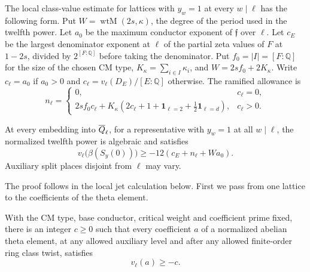 The local class-value estimate for lattices with
\(y_w=1\) at every \(w\mid\ell\) has the following form.
Put \(W=\operatorname{wtM}(2s,\kappa)\), the degree of
the period used in the twelfth power. Let \(a_0\) be the
maximum conductor exponent of \(\mathfrak f\) over \(\ell\).
Let \(c_E\) be the largest denominator exponent at
\(\ell\) of the partial zeta values of \(F\) at \(1-2s\),
divided by \(2^{[F:\mathbb Q]}\) before taking the
denominator. Put \(f_0=|I|=[F:\mathbb Q]\) for the size
of the chosen CM type, \(K_\kappa=\sum_{i\in I}\kappa_i\),
and \(W=2sf_0+2K_\kappa\).
Write \(c_\ell=a_0\) if \(a_0>0\) and
\(c_\ell=v_\ell(D_E)/[E:\mathbb Q]\) otherwise. The
ramified allowance is
\[
 n_\ell =
 \begin{cases}
 0,&c_\ell=0,\\
 2sf_0c_\ell+K_\kappa(2c_\ell+1+
       \mathbf 1_{\ell=2}+\tfrac12\mathbf 1_{\ell=d}),&c_\ell>0 .
 \end{cases}
\]
\begin{proposition}\label{prop:toric-class-denominator}
At every embedding into \(\overline{Q}_\ell\), for a representative
with \(y_w=1\) at all \(w\mid\ell\), the normalized twelfth
power is algebraic and satisfies
\[
    v_\ell\bigl(\beta(S_y(0))\bigr)\ge-12(c_E+n_\ell+Wa_0).
\]
Auxiliary split places disjoint from \(\ell\) may vary.
\end{proposition}
The proof follows in the local jet calculation below. First we pass
from one lattice to the coefficients of the theta element.

\begin{lemma}\label{lem:toric-common-denominator}
With the CM type, base conductor, critical weight and coefficient
prime fixed, there is an integer \(c\ge0\) such that every coefficient \(a\) of a normalized abelian theta element, at any allowed auxiliary level and after any allowed finite-order ring class twist, satisfies
\[
 v_\ell(a)\ge-c.
\]
\end{lemma}

